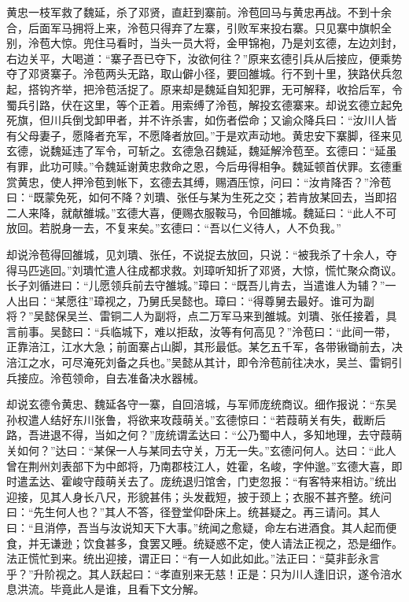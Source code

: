 黄忠一枝军救了魏延，杀了邓贤，直赶到寨前。泠苞回马与黄忠再战。不到十余合，后面军马拥将上来，泠苞只得弃了左寨，引败军来投右寨。只见寨中旗帜全别，泠苞大惊。兜住马看时，当头一员大将，金甲锦袍，乃是刘玄德，左边刘封，右边关平，大喝道：“寨子吾已夺下，汝欲何往？”原来玄德引兵从后接应，便乘势夺了邓贤寨子。泠苞两头无路，取山僻小径，要回雒城。行不到十里，狭路伏兵忽起，搭钩齐举，把泠苞活捉了。原来却是魏延自知犯罪，无可解释，收拾后军，令蜀兵引路，伏在这里，等个正着。用索缚了泠苞，解投玄德寨来。却说玄德立起免死旗，但川兵倒戈卸甲者，并不许杀害，如伤者偿命；又谕众降兵曰：“汝川人皆有父母妻子，愿降者充军，不愿降者放回。”于是欢声动地。黄忠安下寨脚，径来见玄德，说魏延违了军令，可斩之。玄德急召魏延，魏延解泠苞至。玄德曰：“延虽有罪，此功可赎。”令魏延谢黄忠救命之恩，今后毋得相争。魏延顿首伏罪。玄德重赏黄忠，使人押泠苞到帐下，玄德去其缚，赐酒压惊，问曰：“汝肯降否？”泠苞曰：“既蒙免死，如何不降？刘璝、张任与某为生死之交；若肯放某回去，当即招二人来降，就献雒城。”玄德大喜，便赐衣服鞍马，令回雒城。魏延曰：“此人不可放回。若脱身一去，不复来矣。”玄德曰：“吾以仁义待人，人不负我。”

却说泠苞得回雒城，见刘璝、张任，不说捉去放回，只说：“被我杀了十余人，夺得马匹逃回。”刘璝忙遣人往成都求救。刘璋听知折了邓贤，大惊，慌忙聚众商议。长子刘循进曰：“儿愿领兵前去守雒城。”璋曰：“既吾儿肯去，当遣谁人为辅？”一人出曰：“某愿往”璋视之，乃舅氏吴懿也。璋曰：“得尊舅去最好。谁可为副将？”吴懿保吴兰、雷铜二人为副将，点二万军马来到雒城。刘璝、张任接着，具言前事。吴懿曰：“兵临城下，难以拒敌，汝等有何高见？”泠苞曰：“此间一带，正靠涪江，江水大急；前面寨占山脚，其形最低。某乞五千军，各带锹锄前去，决涪江之水，可尽淹死刘备之兵也。”吴懿从其计，即令泠苞前往决水，吴兰、雷铜引兵接应。泠苞领命，自去准备决水器械。

却说玄德令黄忠、魏延各守一寨，自回涪城，与军师庞统商议。细作报说：“东吴孙权遣人结好东川张鲁，将欲来攻葭萌关。”玄德惊曰：“若葭萌关有失，截断后路，吾进退不得，当如之何？”庞统谓孟达曰：“公乃蜀中人，多知地理，去守葭萌关如何？”达曰：“某保一人与某同去守关，万无一失。”玄德问何人。达曰：“此人曾在荆州刘表部下为中郎将，乃南郡枝江人，姓霍，名峻，字仲邈。”玄德大喜，即时遣孟达、霍峻守葭萌关去了。庞统退归馆舍，门吏忽报：“有客特来相访。”统出迎接，见其人身长八尺，形貌甚伟；头发截短，披于颈上；衣服不甚齐整。统问曰：“先生何人也？”其人不答，径登堂仰卧床上。统甚疑之。再三请问。其人曰：“且消停，吾当与汝说知天下大事。”统闻之愈疑，命左右进酒食。其人起而便食，并无谦逊；饮食甚多，食罢又睡。统疑惑不定，使人请法正视之，恐是细作。法正慌忙到来。统出迎接，谓正曰：“有一人如此如此。”法正曰：“莫非彭永言乎？”升阶视之。其人跃起曰：“孝直别来无慈！正是：只为川人逢旧识，遂令涪水息洪流。毕竟此人是谁，且看下文分解。